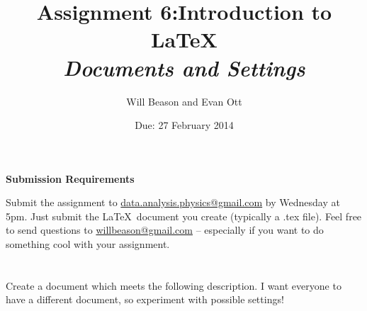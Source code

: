 \documentclass[a4paper,10pt]{article}
\title{\vspace{-1in} Assignment 6:Introduction to
\LaTeX\\\textit{\large{Documents and Settings}}}
\author{Will Beason and Evan Ott}
\date{Due: 27 February 2014}
\begin{document}
\maketitle

\noindent\large{\textbf{Submission Requirements}}\normalsize

Submit the assignment to
\href{mailto:data.analysis.physics@gmail.com}{data.analysis.physics@gmail.com}
by Wednesday at
5pm. Just submit the \LaTeX\ document you create (typically a .tex
file). Feel free to send questions to
\href{mailto:willbeason@gmail.com}{willbeason@gmail.com} -- especially if you
want to do something cool with your assignment.

\section{}


Create a document which meets the following description. I want everyone to have
a different document, so experiment with possible settings!
\end{document}
